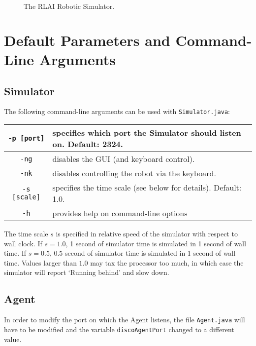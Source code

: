 \documentclass[12pt]{article}
\begin{document}
\begin{figure}
\centerline{
}
\caption{The RLAI Robotic Simulator.}
\end{figure}

\section{Default Parameters and Command-Line Arguments\label{sec:changingDefaults}}

\subsection{Simulator}\label{subsec:simulator_parameters}

The following command-line arguments can be used with \verb+Simulator.java+:

\begin{center}
\begin{tabular}{|c|l|}
\hline
\verb+-p [port]+ & specifies which port the Simulator should listen on. Default: 2324. \\
\hline
\verb+-ng+ & disables the GUI (and keyboard control). \\
\hline
\verb+-nk+ & disables controlling the robot via the keyboard. \\
\hline
\verb+-s [scale]+ & specifies the time scale (see below for details). Default: 1.0. \\
\hline
\verb+-h+ & provides help on command-line options \\ 
\hline
\end{tabular}
\end{center}

The time scale $s$ is specified in relative speed of the simulator with respect 
to wall clock. If $s=1.0$, 1 second of simulator time is simulated in 1 second
of wall time. If $s=0.5$, 0.5 second of simulator time is simulated in 1
second of wall time. Values larger than $1.0$ may tax the processor too much,
in which case the simulator will report `Running behind' and slow down.

\subsection{Agent}

In order to modify the port on which the Agent listens, the file 
\verb+Agent.java+ will have to be modified and the variable \verb+discoAgentPort+ changed to a different value.
\end{document}
